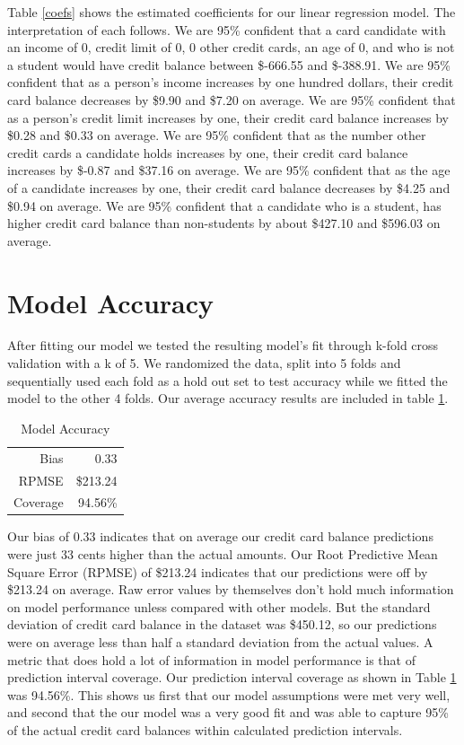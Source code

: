 \documentclass{article}
\begin{document}
Table \ref{coefs} shows the estimated coefficients for our linear regression model. The interpretation of each follows. We are 95\% confident that a card candidate with an income of 0, credit limit of 0, 0 other credit cards, an age of 0, and who is not a student would have credit balance between \$-666.55 and \$-388.91. We are 95\% confident that as a person's income increases by one hundred dollars, their credit card balance decreases by \$9.90 and \$7.20 on average.  We are 95\% confident that as a person's credit limit increases by one, their credit card balance increases by \$0.28 and \$0.33 on average.  We are 95\% confident that as the number other credit cards a candidate holds increases by one, their credit card balance increases by \$-0.87 and \$37.16 on average. We are 95\% confident that as the age of a candidate increases by one, their credit card balance decreases by \$4.25 and \$0.94 on average. We are 95\% confident that a candidate who is a student, has higher credit card balance than non-students by about \$427.10 and \$596.03 on average.

\section{Model Accuracy}
After fitting our model we tested the resulting model's fit through k-fold cross validation with a k of 5. We randomized the data, split into 5 folds and sequentially used each fold as a hold out set to test accuracy while we fitted the model to the other 4 folds. Our average accuracy results are included in table \ref{acc}.

\vspace{10 pt}
\begin{table}[ht]
\centering
\begin{tabular}{rr}
  \hline
  Bias &  0.33 \\ 
  RPMSE & \$213.24 \\ 
  Coverage & 94.56\% \\ 
   \hline
\end{tabular}
\caption{Model Accuracy} 
\label{acc}
\end{table}
\vspace{7 pt}

Our bias of 0.33 indicates that on average our credit card balance predictions were just 33 cents higher than the actual amounts. Our Root Predictive Mean Square Error (RPMSE) of \$213.24 indicates that our predictions were off by \$213.24 on average. Raw error values by themselves don't hold much information on model performance unless compared with other models. But the standard deviation of credit card balance in the dataset was \$450.12, so our predictions were on average less than half a standard deviation from the actual values. A metric that does hold a lot of information in model performance is that of prediction interval coverage. Our prediction interval coverage as shown in Table \ref{acc} was 94.56\%. This shows us first that our model assumptions were met very well, and second that the our model was a very good fit and was able to capture 95\% of the actual credit card balances within calculated prediction intervals.
\end{document}
